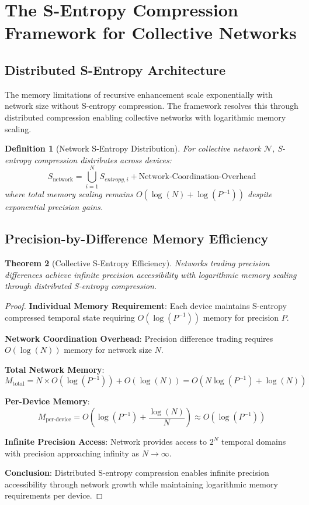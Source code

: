\documentclass[12pt,a4paper]{article}
\newtheorem{theorem}{Theorem}[section]
\newtheorem{definition}[theorem]{Definition}
\begin{document}
\section{The S-Entropy Compression Framework for Collective Networks}

\subsection{Distributed S-Entropy Architecture}

The memory limitations of recursive enhancement scale exponentially with network size without S-entropy compression. The framework resolves this through distributed compression enabling collective networks with logarithmic memory scaling.

\begin{definition}[Network S-Entropy Distribution]
For collective network $\mathcal{N}$, S-entropy compression distributes across devices:
$$S_{\text{network}} = \bigcup_{i=1}^{N} S_{entropy,i} + \text{Network-Coordination-Overhead}$$
where total memory scaling remains $O(\log(N) + \log(P^{-1}))$ despite exponential precision gains.
\end{definition}

\subsection{Precision-by-Difference Memory Efficiency}

\begin{theorem}[Collective S-Entropy Efficiency]
Networks trading precision differences achieve infinite precision accessibility with logarithmic memory scaling through distributed S-entropy compression.
\end{theorem}

\begin{proof}
\textbf{Individual Memory Requirement}: Each device maintains S-entropy compressed temporal state requiring $O(\log(P^{-1}))$ memory for precision $P$.

\textbf{Network Coordination Overhead}: Precision difference trading requires $O(\log(N))$ memory for network size $N$.

\textbf{Total Network Memory}:
$$M_{\text{total}} = N \times O(\log(P^{-1})) + O(\log(N)) = O(N \log(P^{-1}) + \log(N))$$

\textbf{Per-Device Memory}:
$$M_{\text{per-device}} = O(\log(P^{-1}) + \frac{\log(N)}{N}) \approx O(\log(P^{-1}))$$

\textbf{Infinite Precision Access}: Network provides access to $2^N$ temporal domains with precision approaching infinity as $N \to \infty$.

\textbf{Conclusion}: Distributed S-entropy compression enables infinite precision accessibility through network growth while maintaining logarithmic memory requirements per device.
\end{proof}
\end{document}
